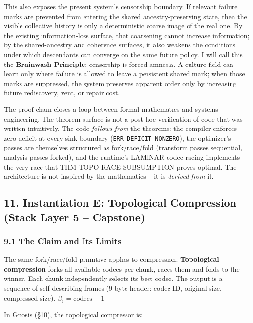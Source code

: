 \documentclass[
  11pt,
]{article}
\begin{document}
This also exposes the present system's censorship boundary. If relevant
failure marks are prevented from entering the shared ancestry-preserving
state, then the visible collective history is only a deterministic
coarse image of the real one. By the existing information-loss surface,
that coarsening cannot increase information; by the shared-ancestry and
coherence surfaces, it also weakens the conditions under which
descendants can converge on the same future policy. I will call this the
\textbf{Brainwash Principle}: censorship is forced amnesia. A culture
field can learn only where failure is allowed to leave a persistent
shared mark; when those marks are suppressed, the system preserves
apparent order only by increasing future rediscovery, vent, or repair
cost.

The proof chain closes a loop between formal mathematics and systems
engineering. The theorem surface is not a post-hoc verification of code
that was written intuitively. The code \emph{follows from} the theorems:
the compiler enforces zero deficit at every sink boundary
(\texttt{ERR\_DEFICIT\_NONZERO}), the optimizer's passes are themselves
structured as fork/race/fold (transform passes sequential, analysis
passes forked), and the runtime's LAMINAR codec racing implements the
very race that THM-TOPO-RACE-SUBSUMPTION proves optimal. The
architecture is not inspired by the mathematics -- it is \emph{derived
from} it.

\subsection{11. Instantiation E: Topological Compression (Stack Layer 5
--
Capstone)}\label{instantiation-e-topological-compression-stack-layer-5-capstone}

\subsubsection{9.1 The Claim and Its
Limits}\label{the-claim-and-its-limits}

The same fork/race/fold primitive applies to compression.
\textbf{Topological compression} forks all available codecs per chunk,
races them and folds to the winner. Each chunk independently selects its
best codec. The output is a sequence of self-describing frames (9-byte
header: codec ID, original size, compressed size).
\(\beta_1 = \text{codecs} - 1\).

In Gnosis (§10), the topological compressor is:
\end{document}
